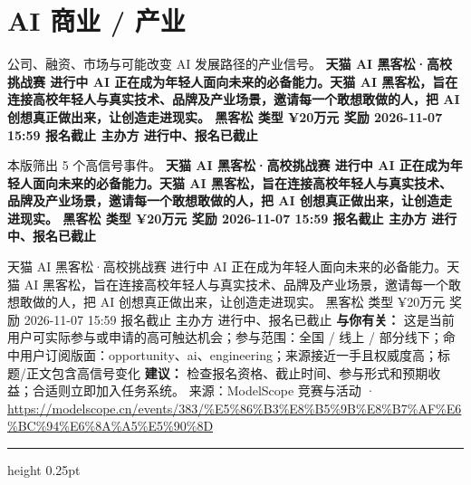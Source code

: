 \documentclass[10.5pt]{ctexart}
\begin{document}
\section*{AI 商业 / 产业}
{\color{ormuted} 公司、融资、市场与可能改变 AI 发展路径的产业信号。}
\vspace{2mm}
{\LARGE\bfseries 天猫 AI 黑客松·高校挑战赛 进行中 AI 正在成为年轻人面向未来的必备能力。天猫 AI 黑客松，旨在连接高校年轻人与真实技术、品牌及产业场景，邀请每一个敢想敢做的人，把 AI 创想真正做出来，让创造走进现实。 黑客松 类型 ¥20万元 奖励 2026-11-07 15:59 报名截止 主办方 进行中、报名已截止}\par
\vspace{1mm}
{\color{ormuted} 本版筛出 5 个高信号事件。}
\vspace{3mm}
{\Large\bfseries 天猫 AI 黑客松·高校挑战赛 进行中 AI 正在成为年轻人面向未来的必备能力。天猫 AI 黑客松，旨在连接高校年轻人与真实技术、品牌及产业场景，邀请每一个敢想敢做的人，把 AI 创想真正做出来，让创造走进现实。 黑客松 类型 ¥20万元 奖励 2026-11-07 15:59 报名截止 主办方 进行中、报名已截止}\par
天猫 AI 黑客松·高校挑战赛 进行中 AI 正在成为年轻人面向未来的必备能力。天猫 AI 黑客松，旨在连接高校年轻人与真实技术、品牌及产业场景，邀请每一个敢想敢做的人，把 AI 创想真正做出来，让创造走进现实。 黑客松 类型 ¥20万元 奖励 2026-11-07 15:59 报名截止 主办方 进行中、报名已截止
\textbf{与你有关：} 这是当前用户可实际参与或申请的高可触达机会；参与范围：全国 / 线上 / 部分线下；命中用户订阅版面：opportunity、ai、engineering；来源接近一手且权威度高；标题/正文包含高信号变化
\textbf{建议：} 检查报名资格、截止时间、参与形式和预期收益；合适则立即加入任务系统。
{\footnotesize\color{ormuted} 来源：ModelScope 竞赛与活动 · \url{https://modelscope.cn/events/383/%E5%86%B3%E8%B5%9B%E8%B7%AF%E6%BC%94%E6%8A%A5%E5%90%8D}}
\vspace{4mm}
\hrule height 0.25pt
\vspace{3mm}
\end{document}
